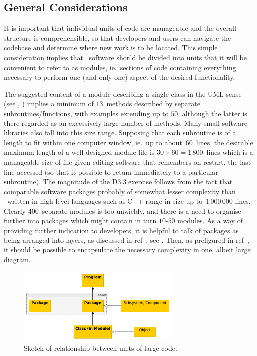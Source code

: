 \subsection{General Considerations}\label{sec:TS_considers}
It is important that individual units of code are manageable and the overall
structure is comprehensible, so that developers and users can navigate the codebase
and determine where new work is to be located.  This simple consideration implies
that \nep\ software should be divided into units that it will be convenient to refer
to as modules, ie.\ sections of code containing everything necessary to perform one
(and only one) aspect of the desired functionality.

The suggested content of a module
describing a single class in the UML sense (see , )
implies a minimum of $13$~methods described by separate subroutines/functions,
with examples extending up to $50$, although the latter is there regarded as an excessively large
number of methods.
Many small software libraries also fall into this size range.
Supposing that each subroutine is of a length to fit within one computer window, ie.\
up to about~$60$~lines, the desirable maximum length of a well-designed module file is
$30\times60 = 1\,800$~lines which is a manageable size of file given 
editing software that remembers on restart, the last line accessed (so that it possible
to return immediately to a particular subroutine).
The magnitude of the D3.3 exercise follows from
the fact that comparable software packages probably of somewhat lesser complexity
than \nep\ written in high level languages such as C++ range in size up to~$1\,000\,000$ lines.
Clearly $400$~separate modules is too unwieldy, and there is a need to organise
further into packages which might contain in turn $10$-$50$ modules. 
As a way of providing further indication to developers,
it is helpful to talk of packages as being arranged into layers, as discussed
in ref~\cite[\S\S\,2.4,3.2]{y2re333}, see \Fig{hierarchygroup}.
Then, as prefigured in ref~\cite[Annex~A]{y2re333}, it should be  possible to encapsulate
the necessary complexity in one, albeit large diagram.
\begin{figure}
\centerline{\includegraphics[width=0.7\textwidth]{./png/hierarchygroup.png}}
\caption{
Sketch of relationship between units of large code.
\label{fig:hierarchygroup}}
\end{figure}

